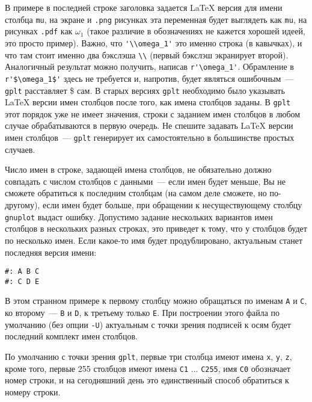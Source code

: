 \documentclass[12pt]{article}
\def\gplt{{\tt gplt}}
\def\gnuplot{{\tt gnuplot}}
\def\png{{\tt .png}}
\def\pdf{{\tt .pdf}}
\begin{document}
В примере в последней строке заголовка задается \LaTeX{} версия для имени столбца \verb'mu', на экране и \png{} рисунках эта переменная
будет выглядеть как \verb'mu', на рисунках \pdf{} как $\omega_1$ (такое различие в обозначениях не кажется хорошей идеей, это просто пример).
Важно, что \verb|'\\omega_1'| это именно строка (в кавычках), и что там стоит именно два бэкслэша \verb'\\' (первый бэкслэш экранирует второй).
Аналогичный результат можно получить, написав \verb|r'\omega_1'|. Обрамление в \verb|r'$\omega_1$'| здесь не требуется и, напротив, будет являться
ошибочным~--- \gplt{} расставляет \$ сам.
В старых версиях \verb'gplt' необходимо было указывать \LaTeX{} версии имен столбцов после того, как имена столбцов заданы.
В \gplt{} этот порядок уже не имеет значения, строки с заданием имен столбцов в любом случае обрабатываются в первую очередь.
Не спешите задавать \LaTeX{} версии имен столбцов~--- \gplt{} генерирует их самостоятельно в большинстве простых случаев.

Число имен в строке, задающей имена столбцов, не обязательно должно совпадать с числом столбцов с данными~--- если имен будет меньше, Вы не сможете обратиться к
последним столбцам (на самом деле сможете, но по-другому), если имен будет больше, при обращении к несуществующему столбцу \gnuplot{} выдаст ошибку.
Допустимо задание нескольких вариантов имен столбцов в нескольких разных строках, это приведет к тому, что у столбцов будет по несколько имен.
Если какое-то имя будет продублировано, актуальным станет последняя версия имени:
\begin{verbatim}
#: A B C
#: C D E
\end{verbatim}
В этом странном примере к первому столбцу можно обращаться по именам \verb'A' и \verb'C', ко второму~--- \verb'B' и \verb'D', к третьему только \verb'E'.
При построении этого файла по умолчанию (без опции \verb'-U') актуальным с точки зрения подписей к осям будет последний комплект имен столбцов. 

По умолчанию с точки зрения \gplt, первые три столбца имеют имена \verb'x', \verb'y', \verb'z', кроме того, первые 255 столбцов имеют имена \verb'C1' ... \verb'C255',
имя \verb'C0' обозначает номер строки, и на сегодняшний день это единственный способ обратиться к номеру строки. 
\end{document}
